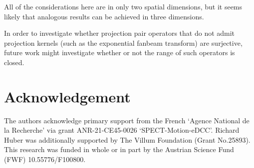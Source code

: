 \documentclass[12pt]{article}
\begin{document}
All of the considerations here are in only two spatial dimensions, but it seems likely that analogous results can be achieved in three dimensions. 

In order to investigate whether projection pair operators that do not admit projection kernels (such as the exponential fanbeam transform) are surjective, future work might investigate whether or not the range of such operators is closed.


\section*{Acknowledgement}
The authors acknowledge primary support from the French `Agence National de la Recherche' via grant ANR-21-CE45-0026 `SPECT-Motion-eDCC’.
Richard Huber was additionally supported by The Villum Foundation (Grant No.25893). {This research was funded in whole or in part by the Austrian Science Fund (FWF) 10.55776/F100800.} 


{
\begin{singlespace}
\footnotesize


\end{singlespace}
}


\end{document}
